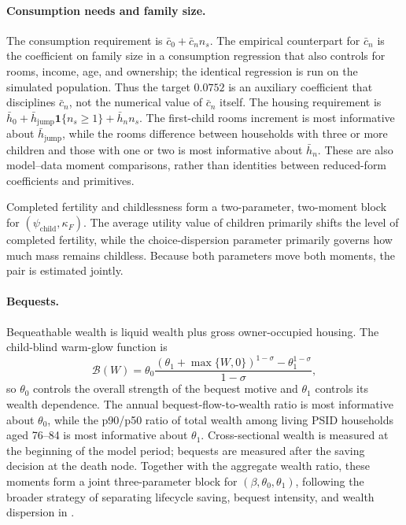 \documentclass[11pt]{article}
\begin{document}
\paragraph{Consumption needs and family size.}
The consumption requirement is $\bar c_0+\bar c_n n_s$. The empirical
counterpart for $\bar c_n$ is the coefficient on family size in a consumption
regression that also controls for rooms, income, age, and ownership; the
identical regression is run on the simulated population. Thus the target
$0.0752$ is an auxiliary coefficient that disciplines $\bar c_n$, not the
numerical value of $\bar c_n$ itself. The housing requirement is
$\bar h_0+\bar h_{\mathrm{jump}}\mathbf 1\{n_s\geq1\}+\bar h_n n_s$. The
first-child rooms increment is most informative about
$\bar h_{\mathrm{jump}}$, while the rooms difference between households with
three or more children and those with one or two is most informative about
$\bar h_n$. These are also model--data moment comparisons, rather than
identities between reduced-form coefficients and primitives.

Completed fertility and childlessness form a two-parameter, two-moment block
for $(\psi_{\mathrm{child}},\kappa_F)$. The average utility value of children
primarily shifts the level of completed fertility, while the choice-dispersion
parameter primarily governs how much mass remains childless. Because both
parameters move both moments, the pair is estimated jointly.

\paragraph{Bequests.}
Bequeathable wealth is liquid wealth plus gross owner-occupied housing. The
child-blind warm-glow function is
\[
\mathcal B(W)=
\theta_0\frac{(\theta_1+\max\{W,0\})^{1-\sigma}
-\theta_1^{1-\sigma}}{1-\sigma},
\]
so $\theta_0$ controls the overall strength of the bequest motive and
$\theta_1$ controls its wealth dependence. The annual bequest-flow-to-wealth
ratio is most informative about $\theta_0$, while the p90/p50 ratio of total
wealth among living PSID households aged 76--84 is most informative about
$\theta_1$. Cross-sectional wealth is measured at the beginning of the model
period; bequests are measured after the saving decision at the death node.
Together with the aggregate wealth ratio, these moments form a joint
three-parameter block for $(\beta,\theta_0,\theta_1)$, following the broader
strategy of separating lifecycle saving, bequest intensity, and wealth
dispersion in \citet{denardiYang2014}.
\end{document}
